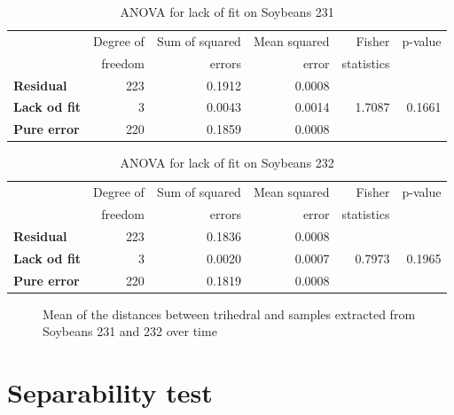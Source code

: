 \documentclass[12pt]{article}
\begin{document}
\begin{table}[hbt]
  \centering
  \caption{ANOVA for lack of fit on Soybeans 231}
  \label{tab:anova_sb231}
  \begin{tabular}{lrrrrr}
    \toprule
    & Degree of & Sum of squared & Mean squared & Fisher & p-value\\
    & freedom & errors & error & statistics &\\
    \cmidrule(lr){2-6}
    \textbf{Residual} & 223 & 0.1912 & 0.0008 & &\\
    \textbf{Lack od fit} & 3 & 0.0043 & 0.0014 & 1.7087 & 0.1661\\
    \textbf{Pure error} & 220 & 0.1859 & 0.0008 & &\\
    \bottomrule
  \end{tabular}
\end{table}

\begin{table}[hbt]
  \centering
  \caption{ANOVA for lack of fit on Soybeans 232}
  \label{tab:anova_sb232}
  \begin{tabular}{lrrrrr}
    \toprule
    & Degree of & Sum of squared & Mean squared & Fisher & p-value\\
    & freedom & errors & error & statistics &\\
    \cmidrule(lr){2-6}
    \textbf{Residual} & 223 & 0.1836 & 0.0008 & &\\
    \textbf{Lack od fit} & 3 & 0.0020 & 0.0007 & 0.7973 & 0.1965\\
    \textbf{Pure error} & 220 & 0.1819 & 0.0008 & &\\
    \bottomrule
  \end{tabular}
\end{table}

\begin{figure}[hbt]
  \caption{Mean of the distances between trihedral and samples extracted from Soybeans 231 and 232 over time}
  \label{fig:tri_mean_sb_231_232}
\end{figure}

\section{Separability test}
\end{document}
